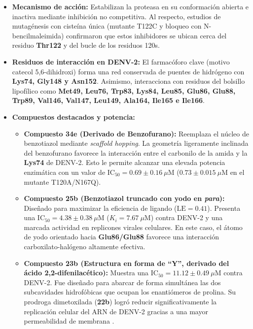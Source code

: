 \begin{itemize}
    \item \textbf{Mecanismo de acción:} Estabilizan la proteasa en su conformación abierta e inactiva mediante inhibición no competitiva. Al respecto, estudios de mutagénesis con cisteína única (mutante T122C y bloqueo con N-bencilmaleimida) confirmaron que estos inhibidores se ubican cerca del residuo \textbf{Thr122} y del bucle de los residuos 120s.
    \item \textbf{Residuos de interacción en DENV-2:} El farmacóforo clave (motivo catecol 5,6-dihidroxi) forma una red conservada de puentes de hidrógeno con \textbf{Lys74, Gly148 y Asn152}. Asimismo, interacciona con residuos del bolsillo lipofílico como \textbf{Met49, Leu76, Trp83, Lys84, Leu85, Glu86, Glu88, Trp89, Val146, Val147, Leu149, Ala164, Ile165 e Ile166}.
    \item \textbf{Compuestos destacados y potencia:}
    \begin{itemize}
        \item \textbf{Compuesto 34e (Derivado de Benzofurano):} Reemplaza el núcleo de benzotiazol mediante \textit{scaffold hopping}. La geometría ligeramente inclinada del benzofurano favorece la interacción entre el carbonilo de la amida y la \textbf{Lys74} de DENV-2. Esto le permite alcanzar una elevada potencia enzimática con un valor de $\text{IC}_{50} = 0.69 \pm 0.16\ \mu\text{M}$ ($0.73 \pm 0.015\ \mu\text{M}$ en el mutante T120A/N167Q).
        \item \textbf{Compuesto 25b (Benzotiazol truncado con yodo en \textit{para}):} Diseñado para maximizar la eficiencia de ligando ($\text{LE} = 0.41$). Presenta una $\text{IC}_{50} = 4.38 \pm 0.38\ \mu\text{M}$ ($K_i = 7.67\ \mu\text{M}$) contra DENV-2 y una marcada actividad en replicones virales celulares. En este caso, el átomo de yodo orientado hacia \textbf{Glu86/Glu88} favorece una interacción carboxilato-halógeno altamente efectiva.
        \item \textbf{Compuesto 23b (Estructura en forma de ``Y'', derivado del ácido 2,2-difenilacético):} Muestra una $\text{IC}_{50} = 11.12 \pm 0.49\ \mu\text{M}$ contra DENV-2. Fue diseñado para abarcar de forma simultánea las dos subcavidades hidrofóbicas que ocupan los enantiómeros de prolina. Su prodroga dimetoxilada (\textbf{22b}) logró reducir significativamente la replicación celular del ARN de DENV-2 gracias a una mayor permeabilidad de membrana \cite{maus2021sar}.
    \end{itemize}
\end{itemize}

